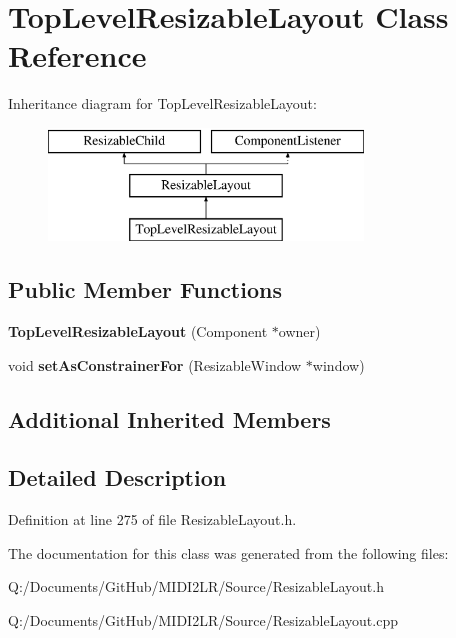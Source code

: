 \hypertarget{class_top_level_resizable_layout}{}\section{Top\+Level\+Resizable\+Layout Class Reference}
\label{class_top_level_resizable_layout}
Inheritance diagram for Top\+Level\+Resizable\+Layout\+:\begin{figure}[H]
\begin{center}
\leavevmode
\includegraphics[height=3.000000cm]{class_top_level_resizable_layout}
\end{center}
\end{figure}
\subsection*{Public Member Functions}
\begin{DoxyCompactItemize}
\item 
{\bfseries Top\+Level\+Resizable\+Layout} (Component $\ast$owner)\hypertarget{class_top_level_resizable_layout_acaf570bc0eabd147a11f9cf1415d44c6}{}\label{class_top_level_resizable_layout_acaf570bc0eabd147a11f9cf1415d44c6}

\item 
void {\bfseries set\+As\+Constrainer\+For} (Resizable\+Window $\ast$window)\hypertarget{class_top_level_resizable_layout_a1b367be76ae2fe9e4caa14e3c1e3f150}{}\label{class_top_level_resizable_layout_a1b367be76ae2fe9e4caa14e3c1e3f150}

\end{DoxyCompactItemize}
\subsection*{Additional Inherited Members}


\subsection{Detailed Description}


Definition at line 275 of file Resizable\+Layout.\+h.



The documentation for this class was generated from the following files\+:\begin{DoxyCompactItemize}
\item 
Q\+:/\+Documents/\+Git\+Hub/\+M\+I\+D\+I2\+L\+R/\+Source/Resizable\+Layout.\+h\item 
Q\+:/\+Documents/\+Git\+Hub/\+M\+I\+D\+I2\+L\+R/\+Source/Resizable\+Layout.\+cpp\end{DoxyCompactItemize}

